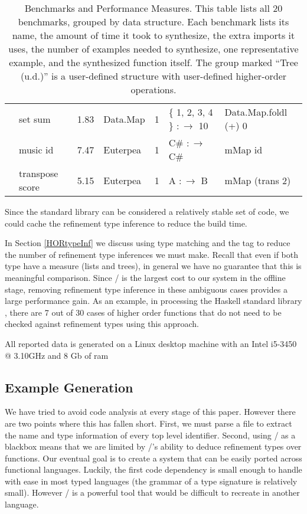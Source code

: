 \begin{table*}[t]
\begin{tabular}{|c|l|c|l|l|l|l|}
    \parbox[t]{2mm}{}
    & set sum & 1.83 & Data.Map & 1 & \{ 1, 2, 3, 4 \} $:\to$ 10 & Data.Map.foldl (+) 0 \\
    & music id & 7.47 & Euterpea & 1 & C\# $:\to$ C\# & mMap id \\
    & transpose score & 5.15 & Euterpea & 1 & A $:\to$ B & mMap (trans 2) \\
    \hline
  \end{tabular}
  \egroup
  \caption{Benchmarks and Performance Measures. This table lists all 20 benchmarks, grouped by data structure. Each benchmark lists its name, the amount of time it took to synthesize, the extra imports it uses, the number of examples needed to synthesize, one representative example, and the synthesized function itself. The group marked ``Tree (u.d.)'' is a user-defined structure with user-defined higher-order operations.}
  \label{tab:benchmarks}
\end{table*}

Since the standard library can be considered a relatively stable set of code, we could cache the refinement type inference to reduce the build time.

In Section \ref{HORtypeInf} we discuss using type matching and the  tag to reduce the number of refinement type inferences we must make. 
Recall that even if both type have a measure (lists and trees), in general we have no guarantee that this is meaningful comparison.
Since \lhask/ is the largest cost to our system in the offline stage, removing refinement type inference in these ambiguous cases provides a large performance gain.
As an example, in processing the Haskell standard library , there are 7 out of 30 cases of higher order functions that do not need to be checked against refinement types using this approach.

All reported data is generated on a Linux desktop machine with an Intel i5-3450 @ 3.10GHz and 8 Gb of ram

\subsection{Example Generation}\label{languageSupport}

We have tried to avoid code analysis at every stage of this paper.
However there are two points where this has fallen short. 
First, we must parse a file to extract the name and type information of every top level identifier. 
Second, using \lhask/ as a blackbox means that we are limited by \lhask/'s ability to deduce refinement types over functions. 
Our eventual goal is to create a system that can be easily ported across functional languages. 
Luckily, the first code dependency is small enough to handle with ease in most typed languages (the grammar of a type signature is relatively small). However \lhask/ is a powerful tool that would be difficult to recreate in another language. 

